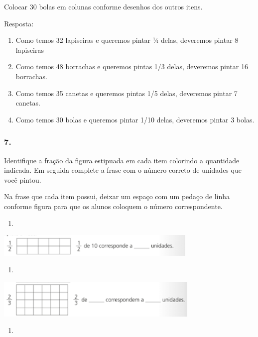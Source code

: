 Colocar 30 bolas em colunas conforme desenhos dos outros itens.

Resposta:

\begin{enumerate}
\def\labelenumi{\alph{enumi})}
\item
  Como temos 32 lapiseiras e queremos pintar ¼ delas, deveremos pintar 8
  lapiseiras
\item
  Como temos 48 borrachas e queremos pintas 1/3 delas, deveremos pintar
  16 borrachas.
\item
  Como temos 35 canetas e queremos pintas 1/5 delas, deveremos pintar 7
  canetas.
\item
  Como temos 30 bolas e queremos pintar 1/10 delas, deveremos pintar 3
  bolas.
\end{enumerate}

\subsubsection{7. }\label{section-110}

Identifique a fração da figura estipuada em cada item colorindo a
quantidade indicada. Em seguida complete a frase com o número correto de
unidades que você pintou.

Na frase que cada item possui, deixar um espaço com um pedaço de linha
conforme figura para que os alunos coloquem o número correspondente.

\begin{enumerate}
\def\labelenumi{\alph{enumi})}
\item
\end{enumerate}

\includegraphics[width=3.79199in,height=0.43337in]{media/image114.png}

\begin{enumerate}
\def\labelenumi{\alph{enumi})}
\item
\end{enumerate}

\includegraphics[width=3.83367in,height=0.72506in]{media/image115.png}

\begin{enumerate}
\def\labelenumi{\alph{enumi})}
\item
\end{enumerate}

